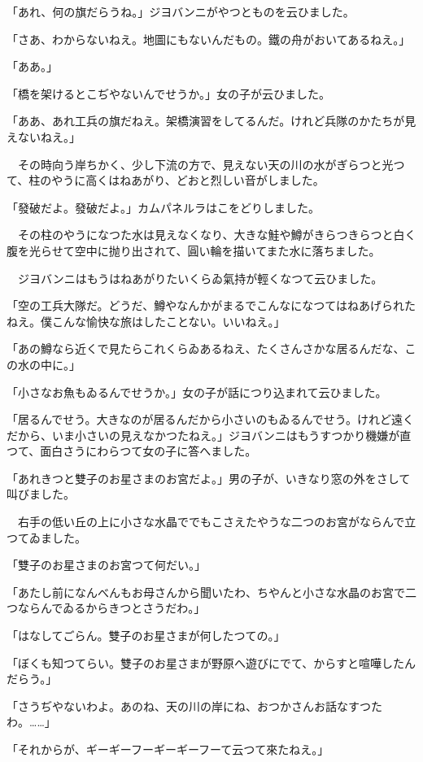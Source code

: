 \documentclass[tate,paper=b6j,jafontsize=9pt]{jlreq}
\begin{document}
「あれ、何の旗だらうね。」ジヨバンニがやつとものを云ひました。

「さあ、わからないねえ。地圖にもないんだもの。鐵の舟がおいてあるねえ。」

「ああ。」

「橋を架けるとこぢやないんでせうか。」女の子が云ひました。

「ああ、あれ工兵の旗だねえ。架橋演習をしてるんだ。けれど兵隊のかたちが見えないねえ。」

　その時向う岸ちかく、少し下流の方で、見えない天の川の水がぎらつと光つて、柱のやうに高くはねあがり、どおと烈しい音がしました。

「發破だよ。發破だよ。」カムパネルラはこをどりしました。

　その柱のやうになつた水は見えなくなり、大きな鮭や鱒がきらつきらつと白く腹を光らせて空中に抛り出されて、圓い輪を描いてまた水に落ちました。

　ジヨバンニはもうはねあがりたいくらゐ氣持が輕くなつて云ひました。

「空の工兵大隊だ。どうだ、鱒やなんかがまるでこんなになつてはねあげられたねえ。僕こんな愉快な旅はしたことない。いいねえ。」

「あの鱒なら近くで見たらこれくらゐあるねえ、たくさんさかな居るんだな、この水の中に。」

「小さなお魚もゐるんでせうか。」女の子が話につり込まれて云ひました。

「居るんでせう。大きなのが居るんだから小さいのもゐるんでせう。けれど遠くだから、いま小さいの見えなかつたねえ。」ジヨバンニはもうすつかり機嫌が直つて、面白さうにわらつて女の子に答へました。

「あれきつと雙子のお星さまのお宮だよ。」男の子が、いきなり窓の外をさして叫びました。

　右手の低い丘の上に小さな水晶ででもこさえたやうな二つのお宮がならんで立つてゐました。

「雙子のお星さまのお宮つて何だい。」

「あたし前になんべんもお母さんから聞いたわ、ちやんと小さな水晶のお宮で二つならんでゐるからきつとさうだわ。」

「はなしてごらん。雙子のお星さまが何したつての。」

「ぼくも知つてらい。雙子のお星さまが野原へ遊びにでて、からすと喧嘩したんだらう。」

「さうぢやないわよ。あのね、天の川の岸にね、おつかさんお話なすつたわ。……」

「それからが、ギーギーフーギーギーフーて云つて來たねえ。」
\end{document}

